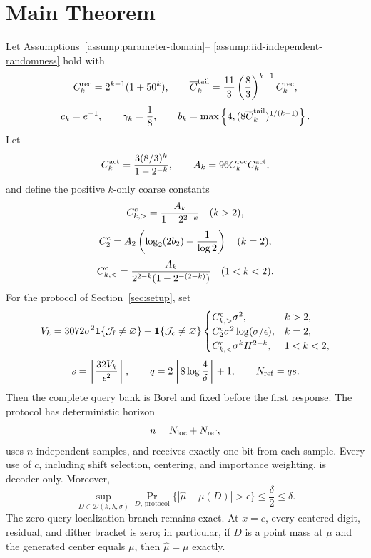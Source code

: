 \section{Main Theorem}\label{sec:main}

\begin{theorem}\label{thm:technical}
Let Assumptions~\ref{assump:parameter-domain}--%
\ref{assump:iid-independent-randomness} hold with
\[
C_k^{\rm rec}=2^{k-1}(1+50^k),\qquad
\overline C_k^{\rm tail}
=\frac{11}{3}\left(\frac83\right)^{k-1}C_k^{\rm rec},
\]
\[
c_k=e^{-1},\qquad
\gamma_k=\frac18,\qquad
b_k=\max\left\{4,
(8\overline C_k^{\rm tail})^{1/(k-1)}\right\}.
\]
Let
\[
C_k^{\rm act}=\frac{3(8/3)^k}{1-2^{-k}},
\qquad
A_k=96C_k^{\rm rec}C_k^{\rm act},
\]
and define the positive \(k\)-only coarse constants
\[
C_{k,>}^{\rm c}=\frac{A_k}{1-2^{2-k}}\quad(k>2),
\]
\[
C_2^{\rm c}
=A_2\left(\log_2(2b_2)+\frac1{\log2}\right)\quad(k=2),
\]
\[
C_{k,<}^{\rm c}
=\frac{A_k}{2^{2-k}(1-2^{-(2-k)})}\quad(1<k<2).
\]
For the protocol of Section~\ref{sec:setup}, set
\[
V_k
=3072\sigma^2\mathbf1\{\mathcal J_{\rm f}\neq\varnothing\}
+\mathbf1\{\mathcal J_{\rm c}\neq\varnothing\}
\begin{cases}
C_{k,>}^{\rm c}\sigma^2,&k>2,\\
C_2^{\rm c}\sigma^2\log(\sigma/\epsilon),&k=2,\\
C_{k,<}^{\rm c}\sigma^kH^{2-k},&1<k<2,
\end{cases}
\]
\[
s=\left\lceil\frac{32V_k}{\epsilon^2}\right\rceil,
\qquad
q=2\left\lceil8\log\frac4\delta\right\rceil+1,
\qquad
N_{\rm ref}=qs.
\]
Then the complete query bank is Borel and fixed before the first response.
The protocol has deterministic horizon
\[
n=N_{\rm loc}+N_{\rm ref},
\]
uses \(n\) independent samples, and receives exactly one bit from each
sample.  Every use of \(c\), including shift selection, centering, and
importance weighting, is decoder-only.  Moreover,
\[
\sup_{D\in\mathcal D(k,\lambda,\sigma)}
\Pr_{D,\,\mathrm{protocol}}
\{|\widehat\mu-\mu(D)|>\epsilon\}
\leq\frac\delta2\leq\delta.
\]
The zero-query localization branch remains exact.  At \(x=c\), every
centered digit, residual, and dither bracket is zero; in particular, if
\(D\) is a point mass at \(\mu\) and the generated center equals \(\mu\),
then \(\widehat\mu=\mu\) exactly.
\end{theorem}


